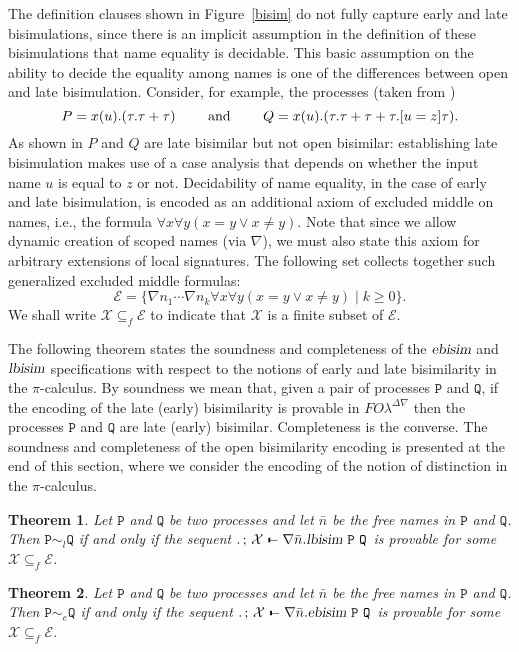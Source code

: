 \documentclass{acmtrans2m}
\newtheorem{theorem}{Theorem}
\def\Escr{{\mathcal E}}
\def\Xscr{{\mathcal X}}
\def\Ppi{{\mathtt P}}
\def\Qpi{{\mathtt Q}}
\def\relbar{\mathrel{\smash-}}
\def\joinrelm{\mathrel{\mkern-3.2mu}}
\def\tailpiece{\kern 1pt\vrule height 1ex width 0.3ex depth -.25ex}
\def\seqsym{\mathrel{\tailpiece\joinrelm\relbar}}
\newcommand{\FOL   }{FO\lambda}
\newcommand{\FOLDNb}{\FOL^{\Delta\nabla}}
\newcommand{\NSeq}[3]{#1\,;\,#2 \seqsym #3}
\newcommand{\ebisim}[2]{\hbox{\sl ebisim}~#1~#2}
\newcommand{\lbisim}[2]{\hbox{\sl lbisim}~#1~#2}
\begin{document}
The definition clauses shown in Figure~\ref{bisim} 
do not fully capture early and late bisimulations, since there is an
implicit assumption in the definition of these bisimulations that
name equality is decidable. This basic assumption on the ability to 
decide the equality among names is one of the differences between 
open and late bisimulation.  Consider,
for example,  the processes (taken from \cite{sangiorgi96acta})
$$P = x(u).(\tau.\tau + \tau) \qquad \hbox{ and } \qquad
Q = x(u).(\tau.\tau + \tau + \tau.[u = z]\tau).$$
As shown in \cite{sangiorgi96acta} $P$ and $Q$ are late bisimilar but
not open bisimilar: establishing late bisimulation makes use 
of a case analysis that depends on
whether the input name $u$ is equal to $z$ or not.  
Decidability of name equality, in the case of early and late bisimulation,
is encoded as an additional axiom of excluded middle on names, i.e., 
the formula $\forall x\forall y (x = y \lor x \not = y)$.
Note that since we allow dynamic creation of scoped names (via
$\nabla$), we must also state this axiom for arbitrary extensions of
local signatures.  The following set collects together such 
generalized excluded middle formulas:
$$
\Escr = \{\nabla n_1\cdots\nabla n_k\forall x\forall y (x = y\lor x\not = y)\mid k\geq 0\}.
$$
We shall write $\Xscr \subseteq_f \Escr$ to indicate that $\Xscr$ is a
finite subset of $\Escr$.


The following theorem states the soundness and completeness of the
$\hbox{\sl ebisim}$ and $\hbox{\sl lbisim}$ specifications with respect to the notions of early and 
late bisimilarity in the $\pi$-calculus. By soundness we mean that, given a
pair of processes $\Ppi$ and $\Qpi$, if the encoding of the late (early)
bisimilarity is provable in $\FOLDNb$ then the processes $\Ppi$ and $\Qpi$ are late (early) bisimilar.
Completeness is the converse.  The soundness and completeness of the
open bisimilarity encoding is presented at the end of this section, where we
consider the encoding of the notion of distinction in the $\pi$-calculus.

\begin{theorem}
\label{thm:lbisim}
Let $\Ppi$ and $\Qpi$ be two processes and let $\bar{n}$ be
the free names in $\Ppi$ and $\Qpi$. 
Then $\Ppi \sim_l \Qpi$ if and only if the sequent
$\NSeq{.}{\Xscr}{\nabla \bar{n}. \lbisim \Ppi \Qpi}$
is provable for some $\Xscr \subseteq_f \Escr$.
\end{theorem}


\begin{theorem}
\label{thm:ebisim}
Let $\Ppi$ and $\Qpi$ be two processes and let $\bar{n}$ be
the free names in $\Ppi$ and $\Qpi$. 
Then $\Ppi \sim_e \Qpi$ if and only if the sequent
$\NSeq{.}{\Xscr}{\nabla \bar{n}. \ebisim \Ppi \Qpi}$
is provable for some $\Xscr \subseteq_f \Escr$.
\end{theorem}
\end{document}

